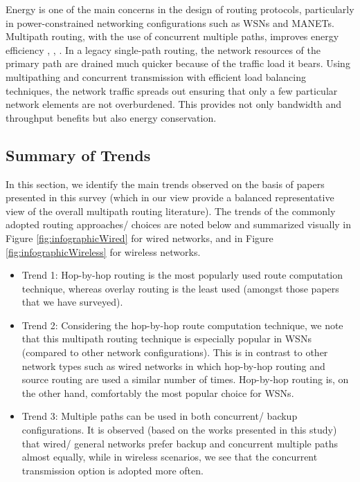 \documentclass[10pt]{IEEEtran}
\begin{document}
Energy is one of the main concerns in the design of routing protocols, particularly in power-constrained networking configurations such as WSNs and MANETs. Multipath routing, with the use of concurrent multiple paths, improves energy efficiency \cite{ganesan2001highly}, \cite{de2003meshed}, \cite{de2003WCNC}. In a legacy single-path routing, the network resources of the primary path are drained much quicker because of the traffic load it bears. Using multipathing and concurrent transmission with efficient load balancing techniques, the network traffic spreads out ensuring that only a few particular network elements are not overburdened. This provides not only bandwidth and throughput benefits but also energy conservation. 

\subsection{Summary of Trends}
\label{subsec:design_guidelines}

In this section, we identify the main trends observed on the basis of papers presented in this survey (which in our view provide a balanced representative view of the overall multipath routing literature). The trends of the commonly adopted routing approaches/ choices are noted below and summarized visually in Figure \ref{fig:infographicWired} for wired networks, and in Figure \ref{fig:infographicWireless} for wireless networks.   



\begin{itemize}

\vspace{1mm}
\item{Trend 1:} Hop-by-hop routing is the most popularly used route computation technique, whereas overlay routing is the least used (amongst those papers that we have surveyed).



\vspace{1mm}
\item{Trend 2:} Considering the hop-by-hop route computation technique, we note that this multipath routing technique is especially popular in WSNs (compared to other network configurations). This is in contrast to other network types such as wired networks in which hop-by-hop routing and source routing are used a similar number of times. Hop-by-hop routing is, on the other hand, comfortably the most popular choice for WSNs. 





\vspace{1mm}
\item{Trend 3:} Multiple paths can be used in both concurrent/ backup configurations. It is observed (based on the works presented in this study) that wired/ general networks prefer backup and concurrent multiple paths almost equally, while in wireless scenarios, we see that the concurrent transmission option is adopted more often.



\end{itemize}
\end{document}
